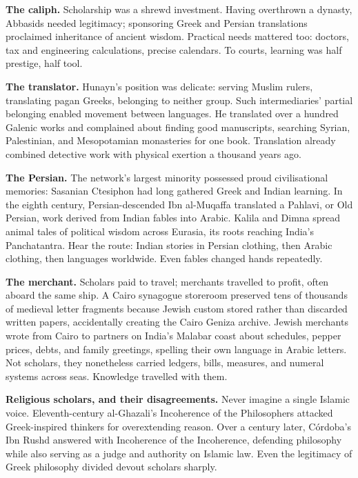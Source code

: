 \textbf{The caliph.} Scholarship was a shrewd investment. Having overthrown a dynasty, Abbasids needed legitimacy; sponsoring Greek and Persian translations proclaimed inheritance of ancient wisdom. Practical needs mattered too: doctors, tax and engineering calculations, precise calendars. To courts, learning was half prestige, half tool.

\textbf{The translator.} Hunayn's position was delicate: serving Muslim rulers, translating pagan Greeks, belonging to neither group. Such intermediaries' partial belonging enabled movement between languages. He translated over a hundred Galenic works and complained about finding good manuscripts, searching Syrian, Palestinian, and Mesopotamian monasteries for one book. Translation already combined detective work with physical exertion a thousand years ago.

\textbf{The Persian.} The network's largest minority possessed proud civilisational memories: Sasanian Ctesiphon had long gathered Greek and Indian learning. In the eighth century, Persian-descended Ibn al-Muqaffa translated a Pahlavi, or Old Persian, work derived from Indian fables into Arabic. Kalila and Dimna spread animal tales of political wisdom across Eurasia, its roots reaching India's Panchatantra. Hear the route: Indian stories in Persian clothing, then Arabic clothing, then languages worldwide. Even fables changed hands repeatedly.

\textbf{The merchant.} Scholars paid to travel; merchants travelled to profit, often aboard the same ship. A Cairo synagogue storeroom preserved tens of thousands of medieval letter fragments because Jewish custom stored rather than discarded written papers, accidentally creating the Cairo Geniza archive. Jewish merchants wrote from Cairo to partners on India's Malabar coast about schedules, pepper prices, debts, and family greetings, spelling their own language in Arabic letters. Not scholars, they nonetheless carried ledgers, bills, measures, and numeral systems across seas. Knowledge travelled with them.

\textbf{Religious scholars, and their disagreements.} Never imagine a single Islamic voice. Eleventh-century al-Ghazali's Incoherence of the Philosophers attacked Greek-inspired thinkers for overextending reason. Over a century later, Córdoba's Ibn Rushd answered with Incoherence of the Incoherence, defending philosophy while also serving as a judge and authority on Islamic law. Even the legitimacy of Greek philosophy divided devout scholars sharply.

